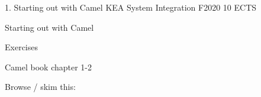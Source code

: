 \documentclass[Screen16to9,17pt]{foils}
\begin{document}
\mytitlepage
{1. Starting out with Camel}
{KEA System Integration F2020 10 ECTS}


\begin{list2}
\item Starting out with Camel
\item
\item
\end{list2}

Exercises
\begin{list2}
\item
\item
\end{list2}




\begin{list1}
\item Camel book chapter 1-2

\item Browse / skim this:\\

\end{list1}




\slidenext
\end{document}
